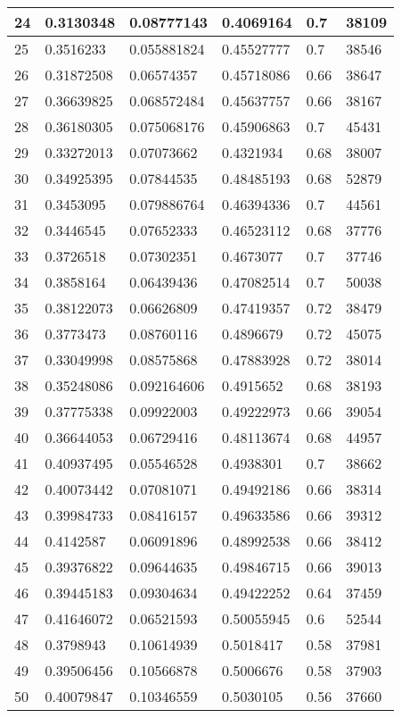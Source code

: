 \begin{longtable}{|l|l|l|l|l|l|}
24 & 0.3130348 & 0.08777143 & 0.4069164 & 0.7 & 38109 \\ \hline 
25 & 0.3516233 & 0.055881824 & 0.45527777 & 0.7 & 38546 \\ \hline 
26 & 0.31872508 & 0.06574357 & 0.45718086 & 0.66 & 38647 \\ \hline 
27 & 0.36639825 & 0.068572484 & 0.45637757 & 0.66 & 38167 \\ \hline 
28 & 0.36180305 & 0.075068176 & 0.45906863 & 0.7 & 45431 \\ \hline 
29 & 0.33272013 & 0.07073662 & 0.4321934 & 0.68 & 38007 \\ \hline 
30 & 0.34925395 & 0.07844535 & 0.48485193 & 0.68 & 52879 \\ \hline 
31 & 0.3453095 & 0.079886764 & 0.46394336 & 0.7 & 44561 \\ \hline 
32 & 0.3446545 & 0.07652333 & 0.46523112 & 0.68 & 37776 \\ \hline 
33 & 0.3726518 & 0.07302351 & 0.4673077 & 0.7 & 37746 \\ \hline 
34 & 0.3858164 & 0.06439436 & 0.47082514 & 0.7 & 50038 \\ \hline 
35 & 0.38122073 & 0.06626809 & 0.47419357 & 0.72 & 38479 \\ \hline 
36 & 0.3773473 & 0.08760116 & 0.4896679 & 0.72 & 45075 \\ \hline 
37 & 0.33049998 & 0.08575868 & 0.47883928 & 0.72 & 38014 \\ \hline 
38 & 0.35248086 & 0.092164606 & 0.4915652 & 0.68 & 38193 \\ \hline 
39 & 0.37775338 & 0.09922003 & 0.49222973 & 0.66 & 39054 \\ \hline 
40 & 0.36644053 & 0.06729416 & 0.48113674 & 0.68 & 44957 \\ \hline 
41 & 0.40937495 & 0.05546528 & 0.4938301 & 0.7 & 38662 \\ \hline 
42 & 0.40073442 & 0.07081071 & 0.49492186 & 0.66 & 38314 \\ \hline 
43 & 0.39984733 & 0.08416157 & 0.49633586 & 0.66 & 39312 \\ \hline 
44 & 0.4142587 & 0.06091896 & 0.48992538 & 0.66 & 38412 \\ \hline 
45 & 0.39376822 & 0.09644635 & 0.49846715 & 0.66 & 39013 \\ \hline 
46 & 0.39445183 & 0.09304634 & 0.49422252 & 0.64 & 37459 \\ \hline 
47 & 0.41646072 & 0.06521593 & 0.50055945 & 0.6 & 52544 \\ \hline 
48 & 0.3798943 & 0.10614939 & 0.5018417 & 0.58 & 37981 \\ \hline 
49 & 0.39506456 & 0.10566878 & 0.5006676 & 0.58 & 37903 \\ \hline 
50 & 0.40079847 & 0.10346559 & 0.5030105 & 0.56 & 37660 \\ \hline 
\end{longtable}
